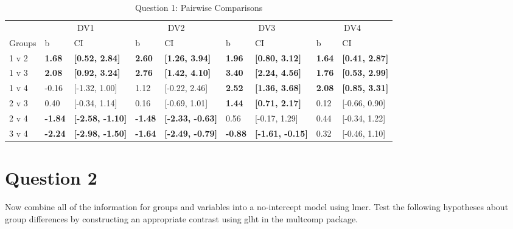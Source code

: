 \documentclass{article}\usepackage[]{graphicx}\usepackage[]{color}
\newenvironment{knitrout}{}{} %
\begin{document}
\begin{knitrout}
\begin{table}
\caption{\label{tab:unnamed-chunk-5}Question 1: Pairwise Comparisons}
\centering
\begin{tabular}[t]{lllllllll}
\toprule
\multicolumn{1}{c}{ } & \multicolumn{2}{c}{DV1} & \multicolumn{2}{c}{DV2} & \multicolumn{2}{c}{DV3} & \multicolumn{2}{c}{DV4} \\
\cmidrule(l{2pt}r{2pt}){2-3} \cmidrule(l{2pt}r{2pt}){4-5} \cmidrule(l{2pt}r{2pt}){6-7} \cmidrule(l{2pt}r{2pt}){8-9}
Groups & b & CI & b & CI & b & CI & b & CI\\
\midrule
1 v 2 & \textbf{1.68} & \textbf{[0.52, 2.84]} & \textbf{2.60} & \textbf{[1.26, 3.94]} & \textbf{1.96} & \textbf{[0.80, 3.12]} & \textbf{1.64} & \textbf{[0.41, 2.87]}\\
1 v 3 & \textbf{2.08} & \textbf{[0.92, 3.24]} & \textbf{2.76} & \textbf{[1.42, 4.10]} & \textbf{3.40} & \textbf{[2.24, 4.56]} & \textbf{1.76} & \textbf{[0.53, 2.99]}\\
1 v 4 & -0.16 & [-1.32, 1.00] & 1.12 & [-0.22, 2.46] & \textbf{2.52} & \textbf{[1.36, 3.68]} & \textbf{2.08} & \textbf{[0.85, 3.31]}\\
2 v 3 & 0.40 & [-0.34, 1.14] & 0.16 & [-0.69, 1.01] & \textbf{1.44} & \textbf{[0.71, 2.17]} & 0.12 & [-0.66, 0.90]\\
2 v 4 & \textbf{-1.84} & \textbf{[-2.58, -1.10]} & \textbf{-1.48} & \textbf{[-2.33, -0.63]} & 0.56 & [-0.17, 1.29] & 0.44 & [-0.34, 1.22]\\
3 v 4 & \textbf{-2.24} & \textbf{[-2.98, -1.50]} & \textbf{-1.64} & \textbf{[-2.49, -0.79]} & \textbf{-0.88} & \textbf{[-1.61, -0.15]} & 0.32 & [-0.46, 1.10]\\
\bottomrule
\end{tabular}
\end{table}


\end{knitrout}



\section{Question 2}
Now combine all of the information for groups and variables into a no-intercept model using lmer\( \). Test the following hypotheses about group differences by constructing an appropriate contrast using glht\( \) in the multcomp package. \\
\end{document}
